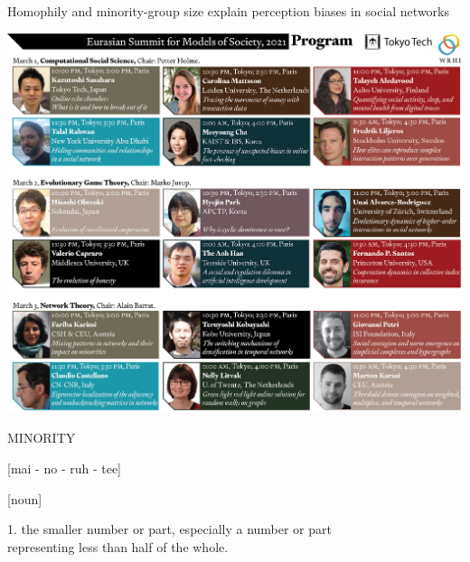 \documentclass{beamer}
\begin{document}
\begin{frame}
    \begin{center}
        \Large{Homophily and minority-group size explain perception biases in social networks}
    \end{center}
\end{frame}

\begin{frame}
    \begin{center}
        \includegraphics[width=\textwidth]{static/eurasian_summit.png}
    \end{center}
\end{frame}

\begin{frame}
    \begin{center}
    \begin{minipage}{.5\textwidth}
        \LARGE{MINORITY}
    \end{minipage}
    \begin{minipage}{.3\textwidth}
        \normalsize{[mai - no - ruh - tee]}
    \end{minipage}
    \vspace{.5cm}

    \hspace{-8cm} \normalsize{[noun]}\\
    \end{center}
    \hspace{.8cm} \normalsize{1. the smaller number or part, especially a number or part} \\
    \hspace{.8cm} \normalsize{representing less than half of the whole.}
\end{frame}
\end{document}
